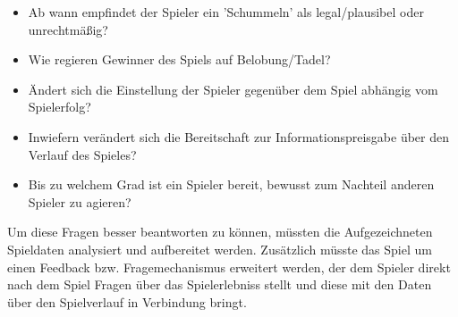 \documentclass[german]{cgspaper} %
\begin{document}
\begin{itemize}
\item Ab wann empfindet der Spieler ein 'Schummeln' als legal/plausibel oder unrechtmäßig?
\item Wie regieren Gewinner des Spiels auf Belobung/Tadel?
\item Ändert sich die Einstellung der Spieler gegenüber dem Spiel abhängig vom Spielerfolg?
\item Inwiefern verändert sich die Bereitschaft zur Informationspreisgabe über den Verlauf des Spieles?
\item Bis zu welchem Grad ist ein Spieler bereit, bewusst zum Nachteil anderen Spieler zu agieren?
\end{itemize}

Um diese Fragen besser beantworten zu können, müssten die Aufgezeichneten Spieldaten analysiert und aufbereitet werden.
Zusätzlich müsste das Spiel um einen Feedback bzw. Fragemechanismus erweitert werden, der dem Spieler direkt nach dem Spiel Fragen über das Spielerlebniss stellt und diese mit den Daten über den Spielverlauf in Verbindung bringt.



\end{document}
